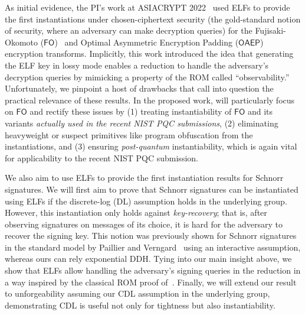 As initial evidence, the PI's work at ASIACRYPT 2022~\cite{}  used ELFs to provide the first instantiations under chosen-ciphertext security (the gold-standard notion of security, where an adversary can make decryption queries) for the  Fujisaki-Okomoto ($\mathsf{FO}$)~\cite{} and Optimal Asymmetric Encryption Padding ($\mathsf{OAEP}$)~\cite{} encryption transforms. Implicitly, this work introduced the idea that generating the ELF key in lossy mode enables a reduction to handle the adversary's decryption queries by mimicking a property of the ROM called  ``observability.''  Unfortunately, we pinpoint a host of drawbacks that call into question the practical relevance of these results. In the proposed work, will particularly focus on $\mathsf{FO}$ and rectify these issues by (1) treating instantiability of $\mathsf{FO}$ and its variants \emph{actually used in the recent NIST PQC submissions}, (2) eliminating heavyweight or suspect primitives like program obfuscation from the instantiations, and  %
(3) ensuring \emph{post-quantum} instantiability, which is again vital for  applicability to the recent NIST PQC submission. %

We also aim to use ELFs to provide the first instantiation results for Schnorr signatures. We will first aim to prove  that  Schnorr signatures  can be instantiated using ELFs if the  discrete-log (DL) assumption holds in the underlying group. However, this instantiation  only holds against \emph{key-recovery}; that is, after observing  signatures on messages of its choice, it is hard for the adversary to recover the signing key. This notion was previously shown for Schnorr signatures in the standard model by Paillier and Verngard~\cite{AC:PaiVer05} using an interactive assumption, whereas ours can rely exponential DDH. Tying into our main insight above, we show that ELFs allow handling the adversary's signing queries in the reduction in a way inspired by the classical ROM proof of~\cite{EC:PoiSte96}. Finally, we will  extend our result to  unforgeability assuming our CDL assumption in the underlying group, demonstrating CDL is useful not only for tightness  but  also  instantiability. %
\fi


